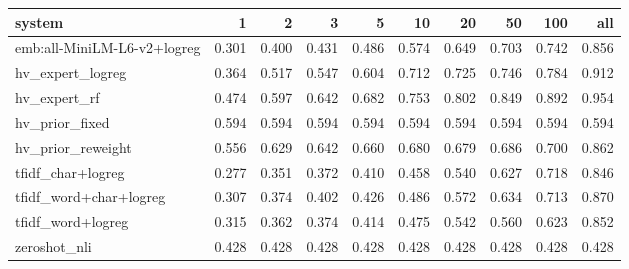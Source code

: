 \begin{tabular}{lrrrrrrrrr}
\toprule
system & 1 & 2 & 3 & 5 & 10 & 20 & 50 & 100 & all \\
\midrule
emb:all-MiniLM-L6-v2+logreg & 0.301 & 0.400 & 0.431 & 0.486 & 0.574 & 0.649 & 0.703 & 0.742 & 0.856 \\
hv\_expert\_logreg & 0.364 & 0.517 & 0.547 & 0.604 & 0.712 & 0.725 & 0.746 & 0.784 & 0.912 \\
hv\_expert\_rf & 0.474 & 0.597 & 0.642 & 0.682 & 0.753 & 0.802 & 0.849 & 0.892 & 0.954 \\
hv\_prior\_fixed & 0.594 & 0.594 & 0.594 & 0.594 & 0.594 & 0.594 & 0.594 & 0.594 & 0.594 \\
hv\_prior\_reweight & 0.556 & 0.629 & 0.642 & 0.660 & 0.680 & 0.679 & 0.686 & 0.700 & 0.862 \\
tfidf\_char+logreg & 0.277 & 0.351 & 0.372 & 0.410 & 0.458 & 0.540 & 0.627 & 0.718 & 0.846 \\
tfidf\_word+char+logreg & 0.307 & 0.374 & 0.402 & 0.426 & 0.486 & 0.572 & 0.634 & 0.713 & 0.870 \\
tfidf\_word+logreg & 0.315 & 0.362 & 0.374 & 0.414 & 0.475 & 0.542 & 0.560 & 0.623 & 0.852 \\
zeroshot\_nli & 0.428 & 0.428 & 0.428 & 0.428 & 0.428 & 0.428 & 0.428 & 0.428 & 0.428 \\
\bottomrule
\end{tabular}
